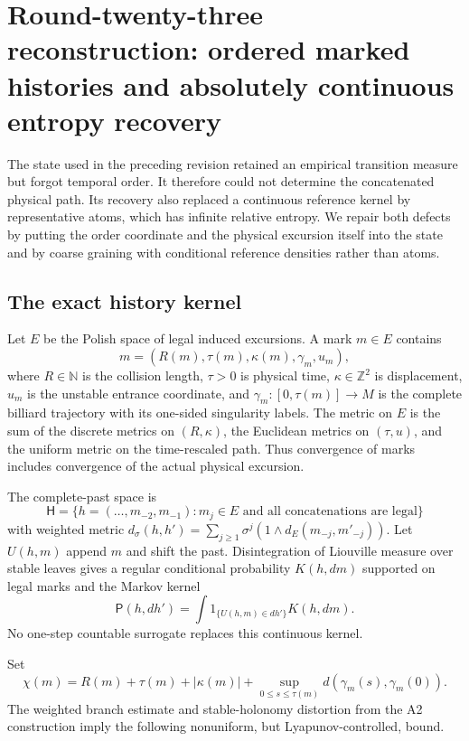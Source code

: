 \section{Round-twenty-three reconstruction: ordered marked histories and absolutely continuous entropy recovery}
\label{sec:r23-a3}

The state used in the preceding revision retained an empirical transition
measure but forgot temporal order.  It therefore could not determine the
concatenated physical path.  Its recovery also replaced a continuous
reference kernel by representative atoms, which has infinite relative
entropy.  We repair both defects by putting the order coordinate and the
physical excursion itself into the state and by coarse graining with
conditional reference densities rather than atoms.

\subsection{The exact history kernel}

Let $E$ be the Polish space of legal induced excursions.  A mark
$m\in E$ contains
\[
 m=(R(m),\tau(m),\kappa(m),\gamma_m,u_m),
\]
where $R\in\mathbb N$ is the collision length, $\tau>0$ is physical time,
$\kappa\in\mathbb Z^2$ is displacement, $u_m$ is the unstable entrance
coordinate, and
$\gamma_m:[0,\tau(m)]\to M$ is the complete billiard trajectory with its
one-sided singularity labels.  The metric on $E$ is the sum of the discrete
metrics on $(R,\kappa)$, the Euclidean metrics on $(\tau,u)$, and the uniform
metric on the time-rescaled path.  Thus convergence of marks includes
convergence of the actual physical excursion.

The complete-past space is
\[
 \mathsf H=\{h=(\ldots,m_{-2},m_{-1}):m_j\in E
             \text{ and all concatenations are legal}\}
\]
with weighted metric
$d_\sigma(h,h')=\sum_{j\ge1}\sigma^j(1\wedge d_E(m_{-j},m'_{-j}))$.
Let $U(h,m)$ append $m$ and shift the past.  Disintegration of Liouville
measure over stable leaves gives a regular conditional probability
$K(h,dm)$ supported on legal marks and the Markov kernel
\[
 \mathsf P(h,dh')=\int 1_{\{U(h,m)\in dh'\}}K(h,dm).
\]
No one-step countable surrogate replaces this continuous kernel.

Set
\[
 \chi(m)=R(m)+\tau(m)+|\kappa(m)|+
 \sup_{0\le s\le\tau(m)}d(\gamma_m(s),\gamma_m(0)).
\]
The weighted branch estimate and stable-holonomy distortion from the A2
construction imply the following nonuniform, but Lyapunov-controlled, bound.

